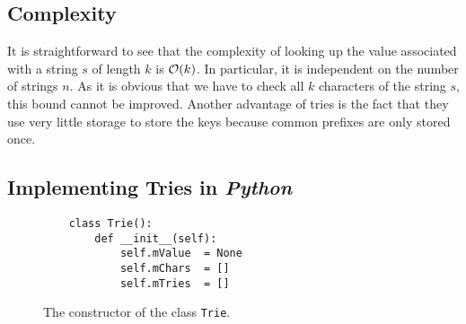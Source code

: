\subsection{Complexity}
It is straightforward to see that the complexity of looking up the value associated with a string
$s$ of length $k$ is $\mathcal{O}(k)$.  In particular, it is independent on the number of strings $n$.  As
it is obvious that we have to check all $k$ characters of the string $s$, this bound cannot be
improved.   Another advantage of tries is the fact that they use very little storage to store the
keys because common prefixes are only stored once. 

\subsection{Implementing Tries in \textsl{Python}}
\begin{figure}[!ht]
\centering
\begin{verbatim}
    class Trie(): 
        def __init__(self):
            self.mValue  = None
            self.mChars  = []
            self.mTries  = []
\end{verbatim}
\vspace*{-0.3cm}
\caption{The constructor of the class \texttt{Trie}.}
\label{fig:trie.ipython-outline}
\end{figure}

